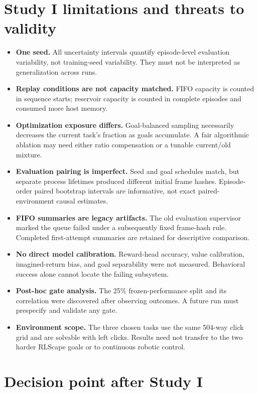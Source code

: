 \documentclass[10pt]{article}
\newcommand{\pct}[1]{#1\%}
\begin{document}
\section{Study I limitations and threats to validity}

\begin{itemize}
  \item \textbf{One seed.} All uncertainty intervals quantify episode-level evaluation variability, not training-seed variability. They must not be interpreted as generalization across runs.
  \item \textbf{Replay conditions are not capacity matched.} FIFO capacity is counted in sequence starts; reservoir capacity is counted in complete episodes and consumed more host memory.
  \item \textbf{Optimization exposure differs.} Goal-balanced sampling necessarily decreases the current task's fraction as goals accumulate. A fair algorithmic ablation may need either ratio compensation or a tunable current/old mixture.
  \item \textbf{Evaluation pairing is imperfect.} Seed and goal schedules match, but separate process lifetimes produced different initial frame hashes. Episode-order paired bootstrap intervals \citep{efron1993bootstrap} are informative, not exact paired-environment causal estimates.
  \item \textbf{FIFO summaries are legacy artifacts.} The old evaluation supervisor marked the queue failed under a subsequently fixed frame-hash rule. Completed first-attempt summaries are retained for descriptive comparison.
  \item \textbf{No direct model calibration.} Reward-head accuracy, value calibration, imagined-return bias, and goal separability were not measured. Behavioral success alone cannot locate the failing subsystem.
  \item \textbf{Post-hoc gate analysis.} The \pct{25} frozen-performance split and its correlation were discovered after observing outcomes. A future run must prespecify and validate any gate.
  \item \textbf{Environment scope.} The three chosen tasks use the same 504-way click grid and are solvable with left clicks. Results need not transfer to the two harder RLScape goals or to continuous robotic control.
\end{itemize}

\section{Decision point after Study I}
\end{document}
